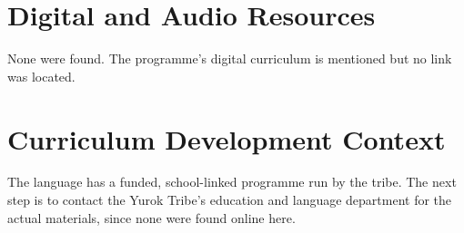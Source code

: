 \documentclass[12pt]{article}
\begin{document}
\section{Digital and Audio Resources}
None were found. The programme's digital curriculum is mentioned but no link was located.

\section{Curriculum Development Context}
The language has a funded, school-linked programme run by the tribe. The next step is to contact the Yurok Tribe's education and language department for the actual materials, since none were found online here.
\end{document}
